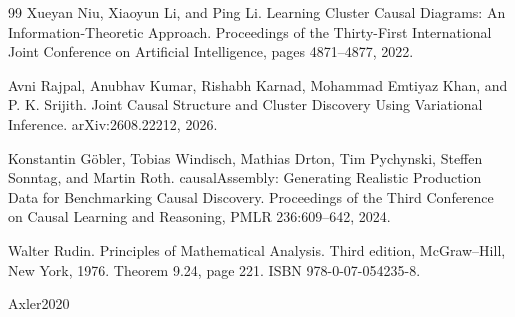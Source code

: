 \documentclass{article}
\begin{document}
\begin{thebibliography}{99}
   Xueyan Niu, Xiaoyun Li, and Ping Li. Learning Cluster Causal Diagrams: An Information-Theoretic Approach. Proceedings of the Thirty-First International Joint Conference on Artificial Intelligence, pages 4871--4877, 2022.

   Avni Rajpal, Anubhav Kumar, Rishabh Karnad, Mohammad Emtiyaz Khan, and P. K. Srijith. Joint Causal Structure and Cluster Discovery Using Variational Inference. arXiv:2608.22212, 2026.

   Konstantin Göbler, Tobias Windisch, Mathias Drton, Tim Pychynski, Steffen Sonntag, and Martin Roth. causalAssembly: Generating Realistic Production Data for Benchmarking Causal Discovery. Proceedings of the Third Conference on Causal Learning and Reasoning, PMLR 236:609--642, 2024.

   Walter Rudin. Principles of Mathematical Analysis. Third edition, McGraw--Hill, New York, 1976. Theorem 9.24, page 221. ISBN 978-0-07-054235-8.

   Axler2020

\end{thebibliography}
\end{document}
